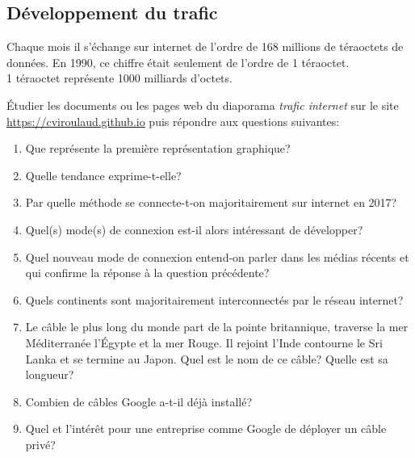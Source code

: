 \documentclass[a4paper,11pt]{article}
\begin{document}
\begin{Form}
\subsection{Développement du trafic}
Chaque mois il s'échange sur internet de l'ordre de 168 millions de téraoctets de données. En 1990, ce chiffre était seulement de l'ordre de 1 téraoctet.\\1 téraoctet représente 1000 milliards d'octets.
\begin{activite}
Étudier les documents ou les pages web du diaporama \emph{trafic internet} sur le site \url{https://cviroulaud.github.io} puis répondre aux questions suivantes:
\begin{enumerate}
\item Que représente la première représentation graphique?
\item Quelle tendance exprime-t-elle?
\item Par quelle méthode se connecte-t-on majoritairement sur internet en 2017?
\item Quel(s) mode(s) de connexion est-il alors intéressant de développer?
\item Quel nouveau mode de connexion entend-on parler dans les médias récents et qui confirme la réponse à la question précédente?
\item Quels continents sont majoritairement interconnectés par le réseau internet?
\item Le câble le plus long du monde part de la pointe britannique, traverse la mer Méditerranée l'Égypte et la mer Rouge. Il rejoint l'Inde contourne le Sri Lanka et se termine au Japon. Quel est le nom de ce câble? Quelle est sa longueur?
\item Combien de câbles Google a-t-il déjà installé?
\item Quel et l'intérêt pour une entreprise comme Google de déployer un câble privé?
\end{enumerate}
\end{activite}

\end{Form}
\end{document}
